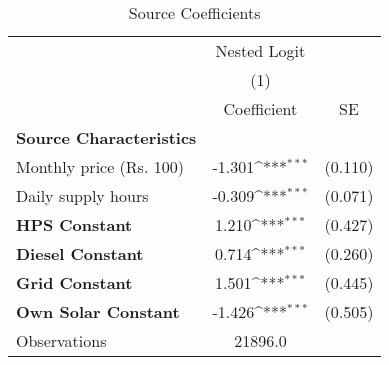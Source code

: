 \begin{table}[htbp]\centering
\def\sym#1{\ifmmode^{#1}\else\(^{#1}\)\fi}
\caption{Source Coefficients}
\begin{tabular}{l*{1}{cc}}
\toprule
& \multicolumn{1}{c}{Nested Logit} & \\
                    &\multicolumn{1}{c}{(1)}         &            \\
                    & Coefficient         &          SE\\
\midrule
\textbf{Source Characteristics}&                     &            \\
Monthly price (Rs. 100)&      -1.301\sym{***}&     (0.110)\\
Daily supply hours  &      -0.309\sym{***}&     (0.071)\\

\midrule
\textbf{HPS Constant}&       1.210\sym{***}&     (0.427)\\
\midrule
\textbf{Diesel Constant}  &    0.714\sym{***}&     (0.260)\\
\midrule
\textbf{Grid Constant}&       1.501\sym{***}&     (0.445)\\
\midrule
\textbf{Own Solar Constant}&   -1.426\sym{***}&     (0.505)\\
\midrule

Observations        &     21896.0         &            \\
\bottomrule
\end{tabular}
\end{table}